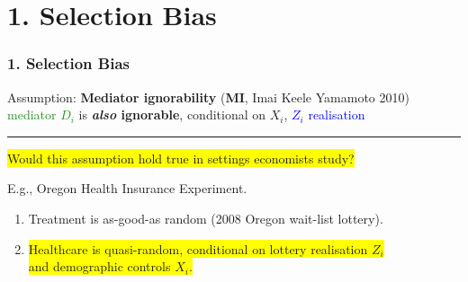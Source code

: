 \documentclass[dvipsnames]{beamer} %
\renewcommand{\vec}[1]{\boldsymbol{\mathit{#1}}}                           %
\newcommand{\indep}{\, \raisebox{0.05em}{\rotatebox[origin=c]{90}{$\models$}} \,}%
\begin{document}
\section{1. Selection Bias}
\begin{frame}
    \frametitle{1. Selection Bias}
    Assumption:
    \textbf{Mediator ignorability} (\textbf{MI}, Imai Keele Yamamoto 2010)
    \vskip0.125cm
    \textcolor{ForestGreen}{mediator $D_i$} is \textbf{\textit{also} ignorable}, conditional on $\vec X_i$, \textcolor{blue}{$Z_i$ realisation}
    \par\noindent\rule{\textwidth}{0.4pt}
    \colorbox{yellow}{Would this assumption hold true in settings economists study?}

    \vskip0.25cm    
    E.g., Oregon Health Insurance Experiment.
    \begin{figure}
    \end{figure}
    \begin{enumerate}
        \item Treatment is as-good-as random (2008 Oregon wait-list lottery).
        \item \colorbox{yellow}{Healthcare is quasi-random, conditional on lottery realisation $Z_i$} \\
        \colorbox{yellow}{and demographic controls $\vec X_i$.}
    \end{enumerate}
\end{frame}
\end{document}
